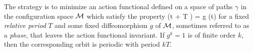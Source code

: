 The strategy
is to minimize an action functional defined on a space of paths $\gamma$ in the
configuration space ${\cal M}$ which satisfy the property
\beq
                               \gamma (t + T ) = g \cdot \gamma (t)                       
\label{McC1desc}
\eeq
for a fixed {\em relative period} $T$ and some fixed diffeomorphism $g$ of ${\cal M}$, 
sometimes referred to as a {\em phase}, that leaves the 
action functional invariant. If $g^k=1$ is of finite order
$k$, then the corresponding orbit is periodic with period $k T$. 

